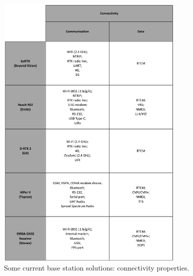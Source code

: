 \begin{figure}[h]
	\centering
	\includegraphics[width=0.8\textwidth]{Chapters/Figures/curr_solutions/CONNECTIONS_v2.pdf}
    \caption{Some current base station solutions: connectivity properties.}
	\label{fig:curr_sol_CONNECTIONS}
\end{figure}

